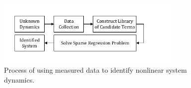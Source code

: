 \documentclass[letterpaper, preprint, paper,11pt]{AAS}	%
\begin{document}
\begin{figure}[h!]
	\centering\includegraphics[width=3.5in]{Figures/SINDYC.pdf}
	\caption{Process of using measured data to identify nonlinear system dynamics.}
	\label{fig:SINCYC}
\end{figure}






\end{document}
